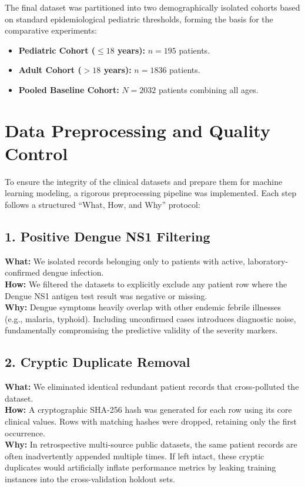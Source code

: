 \documentclass[12pt, a4paper]{report}
\begin{document}
The final dataset was partitioned into two demographically isolated cohorts based on standard epidemiological pediatric thresholds, forming the basis for the comparative experiments:
\begin{itemize}
    \item \textbf{Pediatric Cohort ($\le 18$ years):} $n = 195$ patients.
    \item \textbf{Adult Cohort ($> 18$ years):} $n = 1836$ patients.
    \item \textbf{Pooled Baseline Cohort:} $N = 2032$ patients combining all ages.
\end{itemize}

\section{Data Preprocessing and Quality Control}
To ensure the integrity of the clinical datasets and prepare them for machine learning modeling, a rigorous preprocessing pipeline was implemented. Each step follows a structured ``What, How, and Why'' protocol:

\subsection{1. Positive Dengue NS1 Filtering}
\textbf{What:} We isolated records belonging only to patients with active, laboratory-confirmed dengue infection. \\
\textbf{How:} We filtered the datasets to explicitly exclude any patient row where the Dengue NS1 antigen test result was negative or missing. \\
\textbf{Why:} Dengue symptoms heavily overlap with other endemic febrile illnesses (e.g., malaria, typhoid). Including unconfirmed cases introduces diagnostic noise, fundamentally compromising the predictive validity of the severity markers.

\subsection{2. Cryptic Duplicate Removal}
\textbf{What:} We eliminated identical redundant patient records that cross-polluted the dataset. \\
\textbf{How:} A cryptographic SHA-256 hash was generated for each row using its core clinical values. Rows with matching hashes were dropped, retaining only the first occurrence. \\
\textbf{Why:} In retrospective multi-source public datasets, the same patient records are often inadvertently appended multiple times. If left intact, these cryptic duplicates would artificially inflate performance metrics by leaking training instances into the cross-validation holdout sets.
\end{document}
